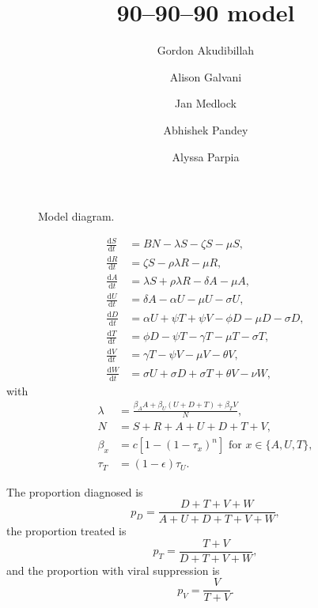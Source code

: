 \documentclass{article}
\title{90--90--90 model}
\author{
  Gordon Akudibillah
  \and
  Alison Galvani
  \and
  Jan Medlock
  \and
  Abhishek Pandey
  \and
  Alyssa Parpia}
\newcommand{\md}{\mathrm{d}}
\begin{document}
\maketitle


\begin{figure}
  \centering
  
  \caption{Model diagram.}
\end{figure}


\begin{equation}
  \label{model_eqns}
  \begin{split}
    \frac{\md S}{\md t} &= B N - \lambda S - \zeta S- \mu S,
    \\
     \frac{\md R}{\md t} & = \zeta S - \rho \lambda R - \mu R,
    \\
    \frac{\md A}{\md t} &= \lambda S +\rho \lambda R - \delta A - \mu A,
    \\
    \frac{\md U}{\md t} &= \delta A - \alpha U - \mu U - \sigma U,
    \\
    \frac{\md D}{\md t} &=  \alpha U + \psi T + \psi V
    - \phi D - \mu D - \sigma D,
    \\
    \frac{\md T}{\md t} &= \phi D - \psi T - \gamma T - \mu T
    - \sigma T,
    \\
    \frac{\md V}{\md t} &= \gamma T - \psi V - \mu V - \theta V,
    \\
    \frac{\md W}{\md t} &= \sigma U + \sigma D + \sigma T + \theta V -
    \nu W,
  \end{split}
\end{equation}
with
\begin{equation}
  \label{force_of_infection}
  \begin{split}
    \lambda &= \frac{\beta_A A + \beta_U (U + D + T) + \beta_T V}{N},
    \\
    N &= S + R +  A + U + D + T + V,
    \\
    \beta_x &= c \left[1 - (1 - \tau_x)^n\right]
    \text{ for $x \in \{A, U, T\}$},
    \\
    \tau_T &= (1 - \epsilon) \tau_U.
  \end{split}
\end{equation}

The proportion diagnosed is
\begin{equation}
  p_D = \frac{D + T + V + W}{A + U + D + T + V + W},
\end{equation}
the proportion treated is
\begin{equation}
  p_T = \frac{T + V}{D + T + V + W},
\end{equation}
and the proportion with viral suppression is
\begin{equation}
  p_V = \frac{V}{T + V}.
\end{equation}
\end{document}
